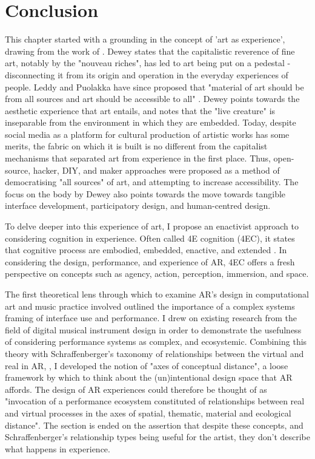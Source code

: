 \section{Conclusion}\label{sec: theory-conclusion}
This chapter started with a grounding in the concept of 'art as experience', drawing from the work of \citep{dewey1934}. Dewey states that the capitalistic reverence of fine art, notably by the "nouveau riches", has led to art being put on a pedestal - disconnecting it from its origin and operation in the everyday experiences of people. Leddy and Puolakka have since proposed that "material of art should be from all sources and art should be accessible to all" \citeyearpar{leddy2021}. Dewey points towards the aesthetic experience that art entails, and notes that the "live creature" is inseparable from the environment in which they are embedded. Today, despite social media as a platform for cultural production of artistic works has some merits, the fabric on which it is built is no different from the capitalist mechanisms that separated art from experience in the first place. Thus, open-source, hacker, DIY, and maker approaches were proposed as a method of democratising "all sources" of art, and attempting to increase accessibility. The focus on the body by Dewey also points towards the move towards tangible interface development, participatory design, and human-centred design.

To delve deeper into this experience of art, I propose an enactivist approach to considering cognition in experience. Often called 4E cognition (4EC), it states that cognitive process are embodied, embedded, enactive, and extended \citep{gallagher2017}. In considering the design, performance, and experience of AR, 4EC offers a fresh perspective on concepts such as agency, action, perception, immersion, and space.

The first theoretical lens through which to examine AR's design in computational art and music practice involved outlined the importance of a complex systems framing of interface use and performance. I drew on existing research from the field of digital musical instrument design \citep{magnusson2009a,discipio2003,essl2006,armstrong2006,hayes2019,chevalier2018} in order to demonstrate the usefulness of considering performance systems as complex, and ecosystemic. Combining this theory with Schraffenberger's taxonomy of relationships between the virtual and real in AR, \citeyearpar{schraffenberger2018}, I developed the notion of "axes of conceptual distance", a loose framework by which to think about the (un)intentional design space that AR affords. The design of AR experiences could therefore be thought of as "invocation of a performance ecosystem constituted of relationships between real and virtual processes in the axes of spatial, thematic, material and ecological distance". The section is ended on the assertion that despite these concepts, and Schraffenberger's relationship types being useful for the artist, they don't describe what happens in experience.

